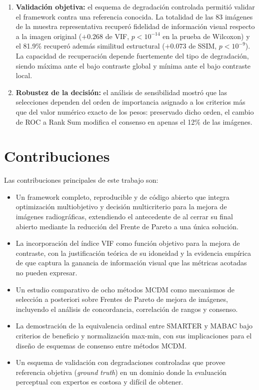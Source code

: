 \begin{enumerate}
    \item \textbf{Validación objetiva:} el esquema de degradación controlada permitió validar el framework contra una referencia conocida. La totalidad de las 83 imágenes de la muestra representativa recuperó fidelidad de información visual respecto a la imagen original ($+0.268$ de VIF, $p < 10^{-14}$ en la prueba de Wilcoxon) y el 81.9\% recuperó además similitud estructural ($+0.073$ de SSIM, $p < 10^{-9}$). La capacidad de recuperación depende fuertemente del tipo de degradación, siendo máxima ante el bajo contraste global y mínima ante el bajo contraste local.

    \item \textbf{Robustez de la decisión:} el análisis de sensibilidad mostró que las selecciones dependen del orden de importancia asignado a los criterios más que del valor numérico exacto de los pesos: preservado dicho orden, el cambio de ROC a Rank Sum modifica el consenso en apenas el 12\% de las imágenes.
\end{enumerate}

\section{Contribuciones}

Las contribuciones principales de este trabajo son:

\begin{itemize}
    \item Un framework completo, reproducible y de código abierto que integra optimización multiobjetivo y decisión multicriterio para la mejora de imágenes radiográficas, extendiendo el antecedente de \citet{More2015} al cerrar su final abierto mediante la reducción del Frente de Pareto a una única solución.
    \item La incorporación del índice VIF como función objetivo para la mejora de contraste, con la justificación teórica de su idoneidad y la evidencia empírica de que captura la ganancia de información visual que las métricas acotadas no pueden expresar.
    \item Un estudio comparativo de ocho métodos MCDM como mecanismos de selección a posteriori sobre Frentes de Pareto de mejora de imágenes, incluyendo el análisis de concordancia, correlación de rangos y consenso.
    \item La demostración de la equivalencia ordinal entre SMARTER y MABAC bajo criterios de beneficio y normalización max-min, con sus implicaciones para el diseño de esquemas de consenso entre métodos MCDM.
    \item Un esquema de validación con degradaciones controladas que provee referencia objetiva (\textit{ground truth}) en un dominio donde la evaluación perceptual con expertos es costosa y difícil de obtener.
\end{itemize}

